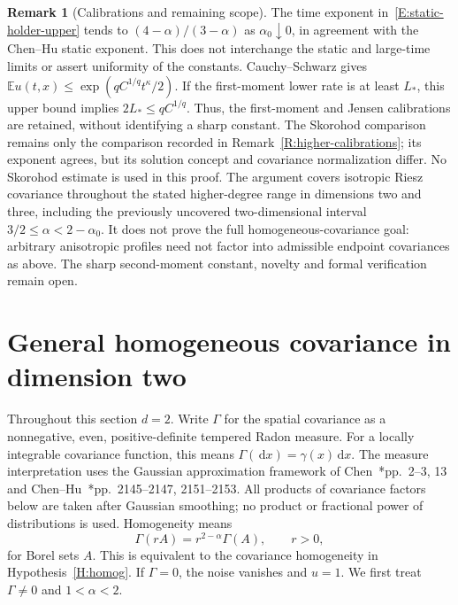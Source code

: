 \documentclass[12pt]{article}
\numberwithin{equation}{section}
\theoremstyle{definition}
\newtheorem{remark}[theorem]{Remark}
\newcommand{\E}{\mathbb{E}}
\newcommand{\ud}{\,\mathrm{d}}
\begin{document}
\begin{remark}[Calibrations and remaining scope]\label{R:static-holder-scope}
  The time exponent in~\eqref{E:static-holder-upper} tends to
  $(4-\alpha)/(3-\alpha)$ as $\alpha_0\downarrow0$, in agreement
  with the Chen--Hu static exponent. This does not interchange the
  static and large-time limits or assert uniformity of the constants.
  Cauchy--Schwarz gives $\E u(t,x)\le
  \exp(qC^{1/q}t^\kappa/2)$. If the first-moment lower rate is at
  least $L_*$, this upper bound implies $2L_*\le qC^{1/q}$.
  Thus, the first-moment and Jensen calibrations are retained, without
  identifying a sharp constant. The Skorohod comparison remains only
  the comparison recorded in Remark~\ref{R:higher-calibrations}; its
  exponent agrees, but its solution concept and covariance normalization
  differ. No Skorohod estimate is used in this proof. The argument covers
  isotropic Riesz covariance throughout the stated higher-degree range
  in dimensions two and three, including the previously uncovered
  two-dimensional interval $3/2\le\alpha<2-\alpha_0$.
  It does not prove the full homogeneous-covariance goal: arbitrary
  anisotropic profiles need not factor into admissible endpoint
  covariances as above. The sharp second-moment constant, novelty and
  formal verification remain open.
\end{remark}

\section{General homogeneous covariance in dimension two}
\label{S:planar-holder}


Throughout this section $d=2$. Write $\Gamma$ for the spatial covariance
as a nonnegative, even, positive-definite tempered Radon measure. For a
locally integrable covariance function, this means
$\Gamma(\ud x)=\gamma(x)\ud x$. The measure interpretation uses the Gaussian
approximation framework of
Chen~\cite{chen:author2026:time-dependency}*{pp.~2--3, 13} and
Chen--Hu~\cite{chen.hu:25:hyperbolic}*{pp.~2145--2147, 2151--2153}.
All products of covariance factors below are taken after Gaussian smoothing;
no product or fractional power of distributions is used. Homogeneity means
\begin{equation}\label{E:planar-measure-scaling}
  \Gamma(rA)=r^{2-\alpha}\Gamma(A),\qquad r>0,
\end{equation}
for Borel sets $A$. This is equivalent to the covariance homogeneity in
Hypothesis~\ref{H:homog}. If $\Gamma=0$, the noise vanishes and $u=1$.
We first treat $\Gamma\ne0$ and $1<\alpha<2$.
\end{document}
